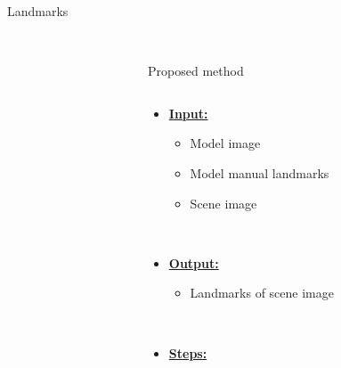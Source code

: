 \documentclass{LaBRI_poster}
\begin{document}
\begin{frame}[t]
\begin{columns}[t]
\begin{column}{\twothirdcolwidth}
\begin{block}{Landmarks}
    \\[2.0cm]
    \\[2cm]
 \end{block}
\end{column}

\begin{column}{\sepwidth}\end{column} %

\end{columns}


\begin{columns}[t] 

\begin{column}{\sepwidth}\end{column} %

\begin{column}{\onecolwidth}
\begin{block}{Proposed method}
	\begin{columns}[t]
		\begin{column}{\threecolwidth}
			
			\begin{itemize}
				\item \textbf{\underline{Input:}} 
					
					\begin{itemize}
						\item Model image
						\item Model manual landmarks
						\item Scene image
					\end{itemize}
					
					~\\[0.5cm]
				\item \textbf{\underline{Output:}} 
					
					\begin{itemize}
						\item Landmarks of scene image
					\end{itemize}		  				
					
					~\\[0.5cm]
  				\item \textbf{\underline{Steps:}}
									

\end{itemize}
\end{column}
\end{columns}
\end{block}
\end{column}
\end{columns}
\end{frame}
\end{document}
